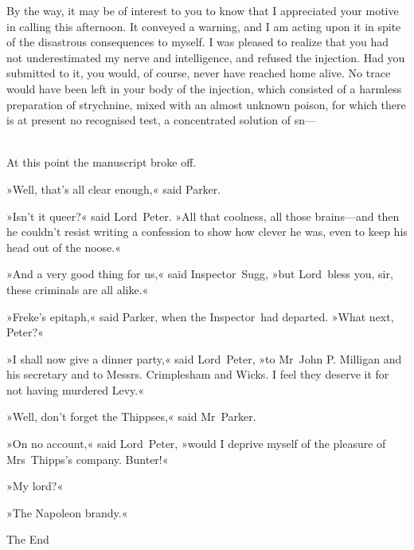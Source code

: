 By the way, it may be of interest to you to know that I appreciated your motive in calling this afternoon. It conveyed a warning, and I am acting upon it in spite of the disastrous consequences to myself. I was pleased to realize that you had not underestimated my nerve and intelligence, and refused the injection. Had you submitted to it, you would, of course, never have reached home alive. No trace would have been left in your body of the injection, which consisted of a harmless preparation of strychnine, mixed with an almost unknown poison, for which there is at present no recognised test, a concentrated solution of sn—

~\\

At this point the manuscript broke off.

»Well, that's all clear enough,« said Parker.

»Isn't it queer?« said Lord~Peter. »All that coolness, all those brains—and then he couldn't resist writing a confession to show how clever he was, even to keep his head out of the noose.«

»And a very good thing for us,« said Inspector~Sugg, »but Lord~bless you, sir, these criminals are all alike.«

»Freke's epitaph,« said Parker, when the Inspector~had departed. »What next, Peter?«

»I shall now give a dinner party,« said Lord~Peter, »to Mr~John P. Milligan and his secretary and to Messrs. Crimplesham and Wicks. I feel they deserve it for not having murdered Levy.«

»Well, don't forget the Thippses,« said Mr~Parker.

»On no account,« said Lord~Peter, »would I deprive myself of the pleasure of Mrs~Thipps's company. Bunter!«

»My lord?«

»The Napoleon brandy.«

\begin{center}\mytitlefont\reasonablyhuge
	The End
\end{center}